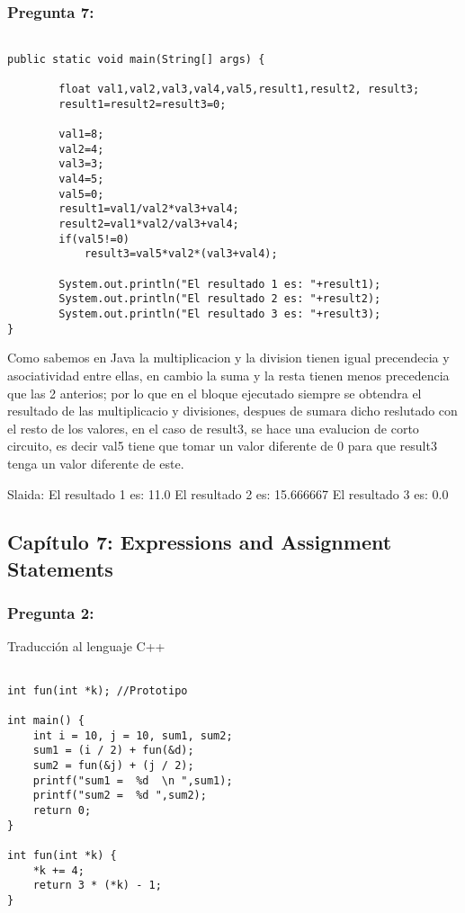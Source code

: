 \documentclass[11pt]{article}
\begin{document}
\subsubsection{Pregunta 7:}
\begin{lstlisting}[frame=single] 

public static void main(String[] args) {
        
        float val1,val2,val3,val4,val5,result1,result2, result3;
        result1=result2=result3=0;
        
        val1=8;
        val2=4;
        val3=3;
        val4=5;
        val5=0;
        result1=val1/val2*val3+val4;
        result2=val1*val2/val3+val4;
        if(val5!=0)
        	result3=val5*val2*(val3+val4);
        
        System.out.println("El resultado 1 es: "+result1);
        System.out.println("El resultado 2 es: "+result2);
        System.out.println("El resultado 3 es: "+result3);
}

\end{lstlisting}
Como sabemos en Java la multiplicacion y la division tienen igual precendecia y asociatividad entre ellas, en cambio la suma y la resta tienen menos precedencia que las 2 anterios; por lo que en el bloque ejecutado siempre se obtendra el resultado de las multiplicacio y divisiones, despues de sumara dicho reslutado con el resto de los valores, en el caso de result3, se hace una evalucion de corto circuito, es decir val5 tiene que tomar un valor diferente de 0 para que result3 tenga un valor diferente de este.

Slaida:
El resultado 1 es: 11.0
El resultado 2 es: 15.666667
El resultado 3 es: 0.0

\subsection{Capítulo 7: Expressions and Assignment Statements}

\subsubsection{Pregunta 2:}
Traducción al lenguaje C++

\begin{lstlisting}[frame = single]

int fun(int *k); //Prototipo

int main() {
    int i = 10, j = 10, sum1, sum2;
    sum1 = (i / 2) + fun(&d);
    sum2 = fun(&j) + (j / 2);
    printf("sum1 =  %d  \n ",sum1);
    printf("sum2 =  %d ",sum2);
    return 0;
}

int fun(int *k) {
    *k += 4;
    return 3 * (*k) - 1;
}
\end{lstlisting}
\end{document}
